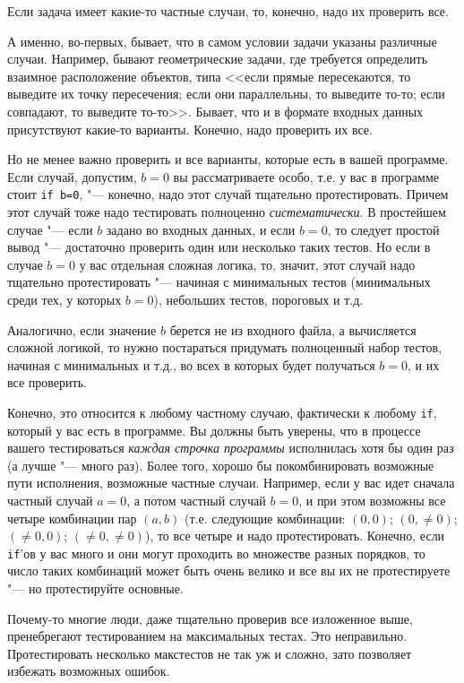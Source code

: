 \documentclass[a4paper,10pt]{problems}
\begin{document}
Если задача имеет какие-то частные случаи, то, конечно, надо их проверить все. 

А именно, во-первых, бывает, что в самом условии задачи указаны различные случаи.
Например, бывают геометрические задачи, где требуется определить взаимное расположение объектов, 
типа <<если прямые пересекаются, то выведите их точку пересечения;
если они параллельны, то выведите то-то; если совпадают, то выведите то-то>>. 
Бывает, что и в формате входных данных присутствуют какие-то варианты.
Конечно, надо проверить их все.

Но не менее важно проверить и все варианты, которые есть в вашей программе. Если случай, допустим, $b=0$ вы рассматриваете особо, 
т.е. у вас в программе стоит \verb`if b=0`, "--- конечно, надо этот случай тщательно протестировать. 
Причем этот случай тоже надо тестировать полноценно \textit{систематически}. 
В простейшем случае "--- если $b$ задано во входных данных, и если $b=0$, то следует простой вывод "--- достаточно проверить один или несколько таких тестов.
Но если в случае $b=0$ у вас отдельная сложная логика, то, значит, этот случай надо тщательно протестировать "--- начиная с минимальных тестов 
(минимальных среди тех, у которых $b=0$), небольших тестов, пороговых и т.д.

Аналогично, если значение $b$ берется не из входного файла, а вычисляется сложной логикой, то нужно постараться придумать полноценный набор тестов,
начиная с минимальных и т.д., во всех в которых будет получаться $b=0$, и их все проверить.

Конечно, это относится к любому частному случаю, фактически к любому \verb`if`, который у вас есть в программе. 
Вы должны быть уверены, что в процессе вашего тестироваться \textit{каждая строчка программы} исполнилась хотя бы один раз (а лучше "--- много раз).
Более того, хорошо бы покомбинировать возможные пути исполнения, возможные частные случаи. 
Например, если у вас идет сначала частный случай $a=0$, а потом частный случай $b=0$, и при этом возможны все четыре комбинации пар $(a,b)$ 
(т.е. следующие комбинации: $(0,0)$; $(0, \neq 0)$; $(\neq 0, 0)$; $(\neq 0, \neq 0)$), то все четыре и надо протестировать.
Конечно, если \verb`if`'ов у вас много и они могут проходить во множестве разных порядков, то число таких комбинаций может быть очень велико
и все вы их не протестируете "--- но протестируйте основные.

Почему-то многие люди, даже тщательно проверив все изложенное выше, пренебрегают тестированием на максимальных тестах.
Это неправильно. Протестировать несколько макстестов не так уж и сложно, зато позволяет избежать возможных ошибок.
\end{document}

